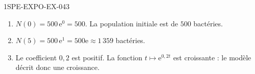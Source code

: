 \begin{corrige}{1SPE-EXPO-EX-043}
\begin{enumerate}
\item $N(0)=500\,\mathrm{e}^{0}=500$. La population initiale est de $500$ bactéries.
\item $N(5)=500\,\mathrm{e}^{1}=500\mathrm{e}\approx 1\,359$ bactéries.
\item Le coefficient $0{,}2$ est positif. La fonction $t\mapsto \mathrm{e}^{0{,}2t}$ est croissante : le modèle décrit donc une croissance.
\end{enumerate}
\end{corrige}
